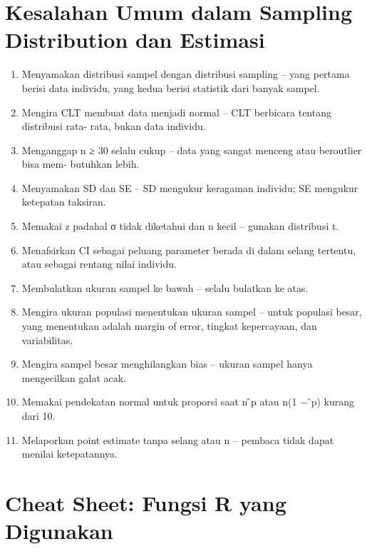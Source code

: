 \documentclass[
  indonesian,
  letterpaper,
]{book}
\begin{document}

\chapter{Kesalahan Umum dalam Sampling Distribution dan
Estimasi}\label{kesalahan-umum-dalam-sampling-distribution-dan-estimasi}

\begin{enumerate}
\def\labelenumi{\arabic{enumi}.}
\item
  Menyamakan distribusi sampel dengan distribusi sampling -- yang
  pertama berisi data individu, yang kedua berisi statistik dari banyak
  sampel.
\item
  Mengira CLT membuat data menjadi normal -- CLT berbicara tentang
  distribusi rata- rata, bukan data individu.
\item
  Menganggap n ≥ 30 selalu cukup -- data yang sangat menceng atau
  beroutlier bisa mem- butuhkan lebih.
\item
  Menyamakan SD dan SE -- SD mengukur keragaman individu; SE mengukur
  ketepatan taksiran.
\item
  Memakai z padahal σ tidak diketahui dan n kecil -- gunakan distribusi
  t.
\item
  Menafsirkan CI sebagai peluang parameter berada di dalam selang
  tertentu, atau sebagai rentang nilai individu.
\item
  Membulatkan ukuran sampel ke bawah -- selalu bulatkan ke atas.
\item
  Mengira ukuran populasi menentukan ukuran sampel -- untuk populasi
  besar, yang menentukan adalah margin of error, tingkat kepercayaan,
  dan variabilitas.
\item
  Mengira sampel besar menghilangkan bias -- ukuran sampel hanya
  mengecilkan galat acak.
\item
  Memakai pendekatan normal untuk proporsi saat n ̂p atau n(1 − ̂p)
  kurang dari 10.
\item
  Melaporkan point estimate tanpa selang atau n -- pembaca tidak dapat
  menilai ketepatannya.
\end{enumerate}


\chapter{Cheat Sheet: Fungsi R yang
Digunakan}\label{cheat-sheet-fungsi-r-yang-digunakan}
\end{document}
